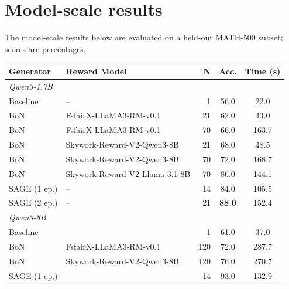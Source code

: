 \documentclass[letterpaper]{article} %
\newcommand{\method}{SAGE}
\begin{document}
\section{\textcolor{orange!85!black}{Model-scale results}}
\label{app:scaling-tables}
\textcolor{orange!85!black}{The model-scale results below are evaluated on a held-out MATH-500 subset; scores are percentages.}

\begin{table}[p]
\centering
\color{blue}
\begin{small}
\begin{sc}
\begin{tabular*}{\linewidth}{@{\extracolsep{\fill}} l l r c c @{}}
\toprule
\textbf{Generator} & \textbf{Reward Model} & \textbf{N} & \textbf{Acc.} & \textbf{Time (s)} \\
\midrule
\multicolumn{5}{l}{\textit{Qwen3-1.7B}} \\
Baseline          & --                                    &   1 & 56.0          & 22.0  \\
BoN               & FsfairX-LLaMA3-RM-v0.1               &  21 & 62.0          & 43.0  \\
BoN               & FsfairX-LLaMA3-RM-v0.1               &  70 & 66.0          & 163.7 \\
BoN               & Skywork-Reward-V2-Qwen3-8B            &  21 & 68.0          & 48.5  \\
BoN               & Skywork-Reward-V2-Qwen3-8B            &  70 & 72.0          & 168.7 \\
BoN               & Skywork-Reward-V2-Llama-3.1-8B        &  70 & 86.0          & 144.1 \\
\method{} (1 ep.) & --                                    &  14 & 84.0          & 105.5 \\
\method{} (2 ep.) & --                                    &  21 & \textbf{88.0} & 152.4 \\
\midrule
\multicolumn{5}{l}{\textit{Qwen3-8B}} \\
Baseline          & --                                    &   1 & 61.0          & 37.0  \\
BoN               & FsfairX-LLaMA3-RM-v0.1               & 120 & 72.0          & 287.7 \\
BoN               & Skywork-Reward-V2-Qwen3-8B            & 120 & 76.0          & 270.7 \\
\method{} (1 ep.) & --                                    &  14 & 93.0          & 132.9 \\

\end{tabular*}
\end{sc}
\end{small}
\end{table}
\end{document}
